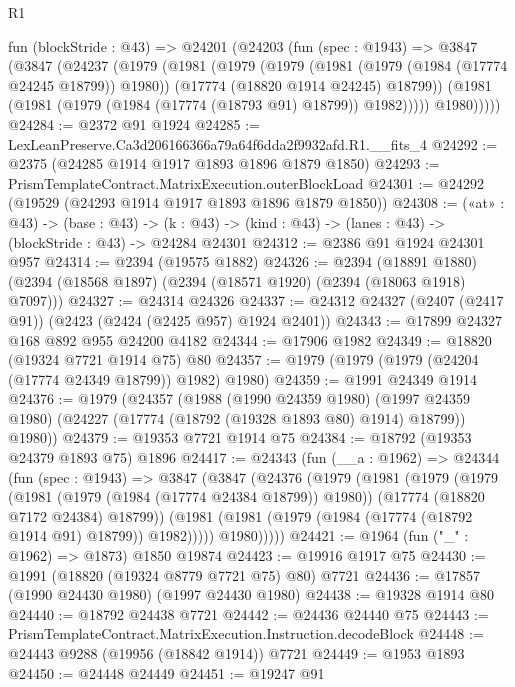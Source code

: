 \begin{lexlean}{R1}
\begin{coremodule}
  fun (blockStride : @43) =>
  @24201
    (@24203
      (fun (spec : @1943) =>
      @3847
        (@3847
          (@24237
            (@1979
              (@1981
                (@1979
                  (@1979
                    (@1981 (@1979 (@1984 (@17774 @24245 @18799)) @1980))
                    (@17774 (@18820 @1914 @24245) @18799))
                  (@1981 (@1981 (@1979 (@1984 (@17774 (@18793 @91) @18799)) @1982)))))
              @1980)))))
@24284 := @2372 @91 @1924
@24285 := LexLeanPreserve.Ca3d206166366a79a64f6dda2f9932afd.R1.__fits_4
@24292 := @2375 (@24285 @1914 @1917 @1893 @1896 @1879 @1850)
@24293 := PrismTemplateContract.MatrixExecution.outerBlockLoad
@24301 := @24292 (@19529 (@24293 @1914 @1917 @1893 @1896 @1879 @1850))
@24308 := («at» : @43) ->
  (base : @43) -> (k : @43) -> (kind : @43) -> (lanes : @43) -> (blockStride : @43) -> @24284 @24301
@24312 := @2386 @91 @1924 @24301 @957
@24314 := @2394 (@19575 @1882)
@24326 := @2394
    (@18891 @1880)
    (@2394 (@18568 @1897) (@2394 (@18571 @1920) (@2394 (@18063 @1918) @7097)))
@24327 := @24314 @24326
@24337 := @24312 @24327 (@2407 (@2417 @91)) (@2423 (@2424 (@2425 @957) @1924 @2401))
@24343 := @17899 @24327 @168 @892 @955 @24200 @4182
@24344 := @17906 @1982
@24349 := @18820 (@19324 @7721 @1914 @75) @80
@24357 := @1979 (@1979 (@1979 (@24204 (@17774 @24349 @18799)) @1982) @1980)
@24359 := @1991 @24349 @1914
@24376 := @1979
    (@24357
      (@1988
        (@1990 @24359 @1980)
        (@1997 @24359 @1980)
        (@24227 (@17774 (@18792 (@19328 @1893 @80) @1914) @18799))
        @1980))
@24379 := @19353 @7721 @1914 @75
@24384 := @18792 (@19353 @24379 @1893 @75) @1896
@24417 := @24343
    (fun (__a : @1962) =>
    @24344
      (fun (spec : @1943) =>
      @3847
        (@3847
          (@24376
            (@1979
              (@1981
                (@1979
                  (@1979
                    (@1981 (@1979 (@1984 (@17774 @24384 @18799)) @1980))
                    (@17774 (@18820 @7172 @24384) @18799))
                  (@1981 (@1981 (@1979 (@1984 (@17774 (@18792 @1914 @91) @18799)) @1982)))))
              @1980)))))
@24421 := @1964 (fun ("_" : @1962) => @1873) @1850 @19874
@24423 := @19916 @1917 @75
@24430 := @1991 (@18820 (@19324 @8779 @7721 @75) @80) @7721
@24436 := @17857 (@1990 @24430 @1980) (@1997 @24430 @1980)
@24438 := @19328 @1914 @80
@24440 := @18792 @24438 @7721
@24442 := @24436 @24440 @75
@24443 := PrismTemplateContract.MatrixExecution.Instruction.decodeBlock
@24448 := @24443 @9288 (@19956 (@18842 @1914)) @7721
@24449 := @1953 @1893
@24450 := @24448 @24449
@24451 := @19247 @91

\end{coremodule}
\end{lexlean}
